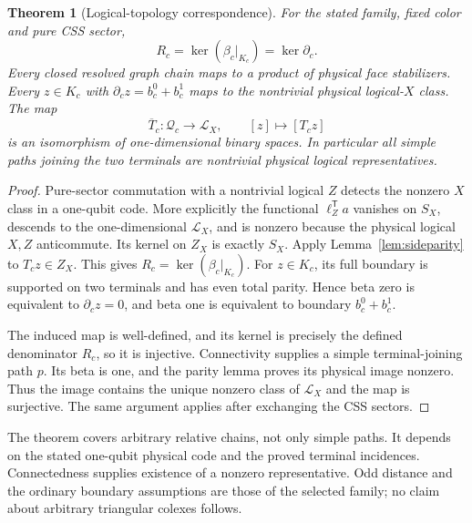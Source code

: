 \documentclass[11pt]{article}
\theoremstyle{definition}
\theoremstyle{plain}
\newtheorem{theorem}[definition]{Theorem}
\theoremstyle{remark}
\begin{document}
\begin{theorem}[Logical-topology correspondence]\label{thm:logical}
For the stated family, fixed color and pure CSS sector,
\[
 R_c=\ker(\beta_c|_{K_c})=\ker\partial_c .
\]
Every closed resolved graph chain maps to a product of physical face
stabilizers. Every $z\in K_c$ with
$\partial_cz=b_c^0+b_c^1$ maps to the nontrivial physical logical-$X$
class. The map
\[
 \overline T_c:\mathcal Q_c\longrightarrow\mathcal L_X,\qquad
 [z]\longmapsto[T_cz]
\]
is an isomorphism of one-dimensional binary spaces.
In particular all simple paths joining the two terminals are
nontrivial physical logical representatives.
\end{theorem}
\begin{proof}
Pure-sector commutation with a nontrivial logical $Z$ detects the
nonzero $X$ class in a one-qubit code. More explicitly the functional
$\ell_Z^{\mathsf T}a$ vanishes on $S_X$, descends to the
one-dimensional $\mathcal L_X$, and is nonzero because the physical
logical $X,Z$ anticommute. Its kernel on $Z_X$ is exactly $S_X$.
Apply Lemma~\ref{lem:sideparity} to $T_cz\in Z_X$. This gives
$R_c=\ker(\beta_c|_{K_c})$.
For $z\in K_c$, its full boundary is supported on two terminals and
has even total parity. Hence beta zero is equivalent to
$\partial_cz=0$, and beta one is equivalent to boundary $b_c^0+b_c^1$.

The induced map is well-defined, and its kernel is precisely the
defined denominator $R_c$, so it is injective.
Connectivity supplies a simple terminal-joining path $p$.
Its beta is one, and the parity lemma proves its physical image
nonzero. Thus the image contains the unique nonzero class of
$\mathcal L_X$ and the map is surjective.
The same argument applies after exchanging the CSS sectors.
\end{proof}

The theorem covers arbitrary relative chains, not only simple paths.
It depends on the stated one-qubit physical code and the proved terminal
incidences. Connectedness supplies existence of a nonzero representative.
Odd distance and the ordinary boundary assumptions are those of the
selected family; no claim about arbitrary triangular colexes follows.
\end{document}
